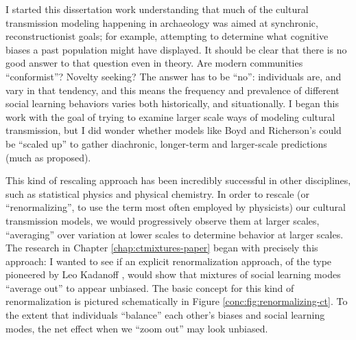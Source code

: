 I started this dissertation work understanding that much of the cultural transmission modeling happening in archaeology was aimed at synchronic, reconstructionist goals; for example, attempting to determine what cognitive biases a past population might have displayed.  It should be clear that there is no good answer to that question even in theory.  Are modern communities ``conformist''?  Novelty seeking?  The answer has to be ``no'':  individuals are, and vary in that tendency, and this means the frequency and prevalence of different social learning behaviors varies both historically, and situationally.  I began this work with the goal of trying to examine larger scale ways of modeling cultural transmission, but I did wonder whether models like Boyd and Richerson's could be ``scaled up'' to gather diachronic, longer-term and larger-scale predictions (much as \citealt{Kandler2013} proposed).  

This kind of rescaling approach has been incredibly successful in other disciplines, such as statistical physics and physical chemistry.  In order to rescale (or ``renormalizing'', to use the term most often employed by physicists) our cultural transmission models, we would progressively observe them at larger scales, ``averaging'' over variation at lower scales to determine behavior at larger scales.  The research in Chapter \ref{chap:ctmixtures-paper} began with precisely this approach:  I wanted to see if an explicit renormalization approach, of the type pioneered by Leo Kadanoff \citeyearpar{Kadanoff2000}, would show that mixtures of social learning modes ``average out'' to appear unbiased.  The basic concept for this kind of renormalization is pictured schematically in Figure \ref{conc:fig:renormalizing-ct}.  To the extent that individuals ``balance'' each other's biases and social learning modes, the net effect when we ``zoom out'' may look unbiased.

